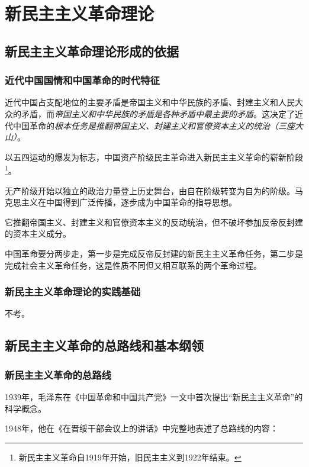 \chapter{新民主主义革命理论}\label{Chapter:新民主主义革命理论}


\section{新民主主义革命理论形成的依据}

    \subsection{近代中国国情和中国革命的时代特征}
    近代中国占支配地位的主要矛盾是帝国主义和中华民族的矛盾、封建主义和人民大众的矛盾，而\emph{帝国主义和中华民族的矛盾是各种矛盾中最主要的矛盾}。这决定了近代中国革命的\emph{根本任务是推翻帝国主义、封建主义和官僚资本主义的统治（三座大山）}。

    以五四运动的爆发为标志，中国资产阶级民主革命进入新民主主义革命的崭新阶段\footnote{新民主主义革命自1919年开始，旧民主主义到1922年结束。}。

    无产阶级开始以独立的政治力量登上历史舞台，由自在阶级转变为自为的阶级。马克思主义在中国得到广泛传播，逐步成为中国革命的指导思想。

    它推翻帝国主义、封建主义和官僚资本主义的反动统治，但不破坏参加反帝反封建的资本主义成分。

    中国革命要分两步走，第一步是完成反帝反封建的新民主主义革命任务，第二步是完成社会主义革命任务，这是性质不同但又相互联系的两个革命过程。

    \subsection{新民主主义革命理论的实践基础}
    不考。


\section{新民主主义革命的总路线和基本纲领}

    \subsection{新民主主义革命的总路线}
    1939年，毛泽东在《中国革命和中国共产党》一文中首次提出“新民主主义革命”的科学概念。

    1948年，他在《在晋绥干部会议上的讲话》中完整地表述了总路线的内容：

